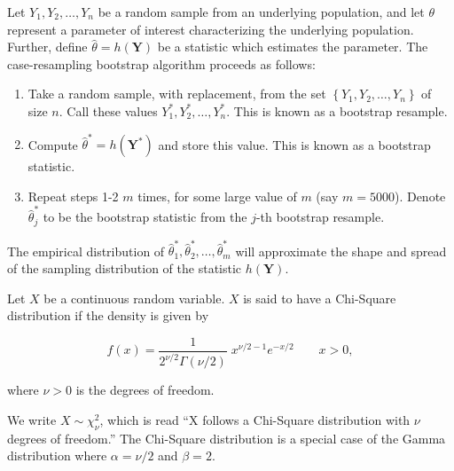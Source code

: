 \documentclass[
  letterpaper,
  DIV=11,
  numbers=noendperiod]{scrreprt}
\providecommand{\tightlist}{%
  \setlength{\itemsep}{0pt}\setlength{\parskip}{0pt}}\usepackage{longtable,booktabs,array}
\theoremstyle{definition}
\theoremstyle{definition}
\theoremstyle{plain}
\theoremstyle{remark}
\begin{document}
\begin{description}
\tightlist
\item[Case-Resampling Bootstrap (Definition~\ref{def-case-bootstrap})]
Let \(Y_1, Y_2, \dotsc, Y_n\) be a random sample from an underlying
population, and let \(\theta\) represent a parameter of interest
characterizing the underlying population. Further, define
\(\widehat{\theta} = h(\mathbf{Y})\) be a statistic which estimates the
parameter. The case-resampling bootstrap algorithm proceeds as follows:
\end{description}

\begin{enumerate}
\def\labelenumi{\arabic{enumi}.}
\tightlist
\item
  Take a random sample, with replacement, from the set
  \(\left\{Y_1, Y_2, \dotsc, Y_n\right\}\) of size \(n\). Call these
  values \(Y_1^*, Y_2^*, \dotsc, Y_n^*\). This is known as a bootstrap
  resample.
\item
  Compute \(\widehat{\theta}^* = h\left(\mathbf{Y}^*\right)\) and store
  this value. This is known as a bootstrap statistic.
\item
  Repeat steps 1-2 \(m\) times, for some large value of \(m\) (say
  \(m = 5000\)). Denote \(\widehat{\theta}^*_j\) to be the bootstrap
  statistic from the \(j\)-th bootstrap resample.
\end{enumerate}

The empirical distribution of
\(\widehat{\theta}_1^*, \widehat{\theta}_2^*, \dotsc, \widehat{\theta}_m^*\)
will approximate the shape and spread of the sampling distribution of
the statistic \(h(\mathbf{Y})\).

\begin{description}
\tightlist
\item[Chi-Square Distribution
(Definition~\ref{def-chi-square-distribution})]
Let \(X\) be a continuous random variable. \(X\) is said to have a
Chi-Square distribution if the density is given by
\end{description}

\[f(x) = \frac{1}{2^{\nu/2}\Gamma (\nu/2)}\;x^{\nu/2-1}e^{-x/2} \qquad x > 0,\]

where \(\nu > 0\) is the degrees of freedom.

We write \(X \sim \chi^2_{\nu}\), which is read ``X follows a Chi-Square
distribution with \(\nu\) degrees of freedom.'' The Chi-Square
distribution is a special case of the Gamma distribution where
\(\alpha = \nu/2\) and \(\beta = 2\).
\end{document}
